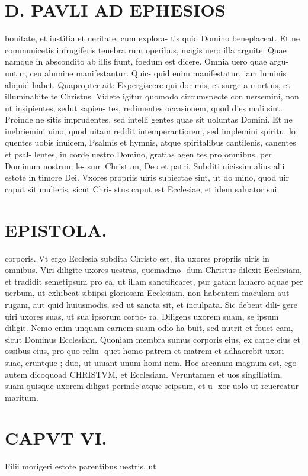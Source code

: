\documentclass{article}
\begin{document}
\begin{pages}
\section*{D. PAVLI AD EPHESIOS }
\marginpar{[ p.6.  ]}
\marginpar{[ p.7.  ]}
\marginpar{[ p.8.  ]}
\marginpar{[ p.9.  ]}\pstart bonitate, et iustitia et ueritate, cum explora- tis quid Domino beneplaceat.  \pend\pstart Et ne communicetis infrugiferis tenebra rum operibus, magis uero illa arguite. Quae namque in abscondito ab illis fiunt, foedum est dicere. Omnia uero quae argu- untur, ceu alumine manifestantur. Quic- quid enim manifestatur, iam luminis aliquid habet. Quapropter ait: Expergiscere qui dor mis, et surge a mortuis, et illuminabite te Christus.  \pend\pstart Videte igitur quomodo circumspecte con uersemini, non ut insipientes, sedut sapien- tes, redimentes occasionem, quod dies mali sint. Proinde ne sitis imprudentes, sed intelli gentes quae sit uoluntas Domini.  \pend\pstart Et ne inebriemini uino, quod uitam reddit intemperantiorem, sed implemini spiritu, lo quentes uobis inuicem, Psalmis et hymnis, atque  spiritalibus cantilenis, canentes et psal- lentes, in corde uestro Domino, gratias agen tes pro omnibus, per Dominum nostrum le- sum Christum, Deo et patri.  \pend\pstart Subditi uicissim alius alii estote in timore Dei.  Vxores propriis uiris subiectae sint, ut do mino, quod uir caput sit mulieris, sicut Chri- stus caput est Ecclesiae, et idem saluator sui  \pend
\section*{EPISTOLA.  }
\marginpar{[ p.15 ]}
\marginpar{[ p.10.  ]}
\marginpar{[ p.11.  ]}
\marginpar{[ p.1. ]}\pstart corporis. Vt ergo Ecclesia subdita Christo est, ita uxores propriis uiris in omnibus.  \pend\pstart Viri diligite uxores uestras, quemadmo- dum Christus dilexit Ecclesiam, et tradidit semetipsum pro ea, ut illam sanctificaret, pur gatam lauacro aquae per uerbum, ut exhibeat sibiipsi gloriosam Ecclesiam, non habentem maculam aut rugam, aut quid huiusmodis, sed ut sancta sit, et inculpata. Sic debent dili- gere uiri uxores suas, ut sua ipsorum corpo- ra. Diligens uxorem suam, se ipsum diligit. Nemo enim unquam carnem suam odio ha buit, sed nutrit et fouet eam, sicut Dominus Ecclesiam.  \pend\pstart Quoniam membra sumus corporis eius, ex carne eius et ossibus eius, pro quo relin- quet homo patrem et matrem et adhaerebit uxori suae, eruntque ; duo, ut uiuant unum homi nem. Hoc arcanum magnum est, ego autem dicoquoad CHRISTVM, et Ecclesiam. Veruntamen et uos singillatim, suam quisque  uxorem diligat perinde atque seipsum, et u- xor uolo ut reuereatur maritum.  \pend
\endnumbering\beginnumbering\section{CAPVT VI.}\pstart Filii morigeri estote parentibus uestris, ut  \pend

\end{pages}
\end{document}
